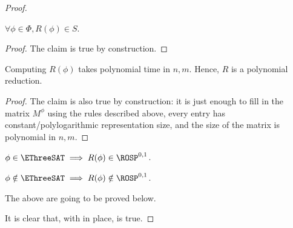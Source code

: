 \begin{proof}
	\begin{claim}
	\label{claim:reduction_symmetric_rosp_zero_one}
		$\forall \phi \in \Phi, R(\phi)\in S$.
	\end{claim}
	\begin{proof}
		The claim is true by construction.
	\end{proof}
	
	\begin{claim}
	\label{claim:polynomial_reduction_rosp_zero_one}
		Computing $R(\phi)$ takes polynomial time in $n, m$. Hence, $R$ is a polynomial reduction.
	\end{claim}
	\begin{proof}
		The claim is also true by construction: it is just enough to fill in the matrix $M^\phi$ using the rules described above, every entry has constant/polylogarithmic representation size, and the size of the matrix is polynomial in $n, m$.
	\end{proof}
	
	\begin{claim}
	\label{claim:right_implication_rosp_zero_one}
		$\phi\in\EThreeSAT \implies R(\phi) \in \ROSP^{0,1}$.
	\end{claim}
	
	\begin{claim}
	\label{claim:left_implication_rosp_zero_one}
		$\phi\notin\EThreeSAT \implies R(\phi) \notin \ROSP^{0,1}$.
	\end{claim}
	
	The above  are going to be proved below.
	
	It is clear that, with  in place,  is true.
\end{proof}

